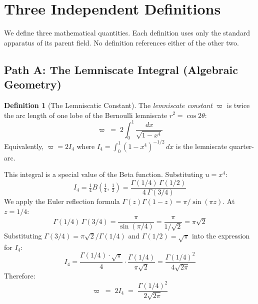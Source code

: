 \documentclass[12pt]{article}
\theoremstyle{definition}
\newtheorem{definition}[theorem]{Definition}
\theoremstyle{remark}
\begin{document}
\section{Three Independent Definitions}
\label{sec:three}

We define three mathematical quantities. Each definition uses only the standard apparatus of its parent field. No definition references either of the other two.

\subsection{Path A: The Lemniscate Integral (Algebraic Geometry)}

\begin{definition}[The Lemniscatic Constant]
\label{def:varpi}
The \emph{lemniscate constant} $\varpi$ is twice the arc length of one lobe of the Bernoulli lemniscate $r^2 = \cos 2\theta$:
\begin{equation}
    \varpi \;=\; 2\!\int_0^1 \frac{dx}{\sqrt{1-x^4}}
\end{equation}
Equivalently, $\varpi = 2I_4$ where $I_4 = \int_0^1 (1-x^4)^{-1/2}\,dx$ is the lemniscate quarter-arc.
\end{definition}

This integral is a special value of the Beta function. Substituting $u = x^4$:
\begin{equation}
    I_4 = \tfrac{1}{4}B\!\left(\tfrac{1}{4},\,\tfrac{1}{2}\right) = \frac{\Gamma(1/4)\,\Gamma(1/2)}{4\,\Gamma(3/4)}
\end{equation}
We apply the Euler reflection formula $\Gamma(z)\Gamma(1-z) = \pi/\sin(\pi z)$. At $z = 1/4$:
\begin{equation}
    \Gamma(1/4)\,\Gamma(3/4) = \frac{\pi}{\sin(\pi/4)} = \frac{\pi}{1/\sqrt{2}} = \pi\sqrt{2}
\end{equation}
Substituting $\Gamma(3/4) = \pi\sqrt{2}/\Gamma(1/4)$ and $\Gamma(1/2) = \sqrt{\pi}$ into the expression for $I_4$:
\begin{equation}
    I_4 = \frac{\Gamma(1/4)\cdot\sqrt{\pi}}{4}\cdot\frac{\Gamma(1/4)}{\pi\sqrt{2}} = \frac{\Gamma(1/4)^2}{4\sqrt{2\pi}}
\end{equation}
Therefore:
\begin{equation}
    \boxed{\;\varpi \;=\; 2I_4 \;=\; \frac{\Gamma(1/4)^2}{2\sqrt{2\pi}}\;}
    \label{eq:varpi}
\end{equation}
\end{document}
